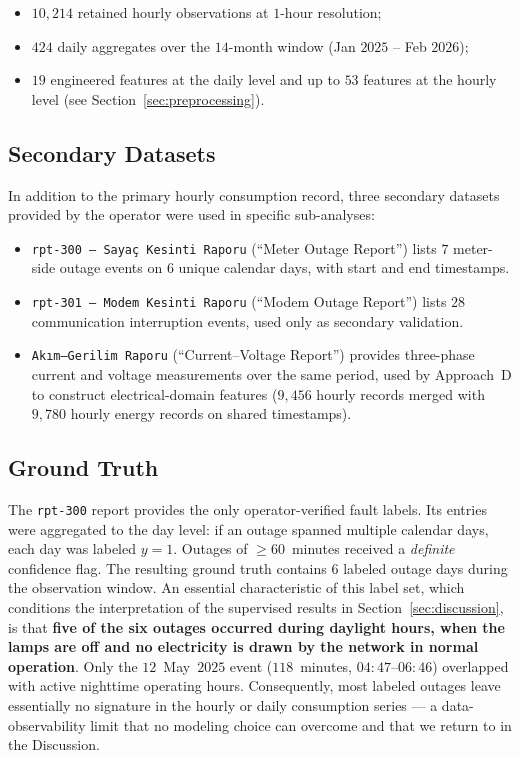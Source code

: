 \documentclass[11pt]{article}
\begin{document}
\begin{itemize}[leftmargin=1.5em,itemsep=0pt]
  \item $10{,}214$ retained hourly observations at $1$-hour resolution;
  \item $424$ daily aggregates over the $14$-month window (Jan $2025$ -- Feb $2026$);
  \item $19$ engineered features at the daily level and up to $53$ features at the hourly level (see Section~\ref{sec:preprocessing}).
\end{itemize}

\subsection{Secondary Datasets}
In addition to the primary hourly consumption record, three secondary datasets provided by the operator were used in specific sub-analyses:

\begin{itemize}[leftmargin=1.5em,itemsep=1pt]
  \item \texttt{rpt-300 --- Sayaç Kesinti Raporu} (``Meter Outage Report'') lists $7$ meter-side outage events on $6$ unique calendar days, with start and end timestamps.
  \item \texttt{rpt-301 --- Modem Kesinti Raporu} (``Modem Outage Report'') lists $28$ communication interruption events, used only as secondary validation.
  \item \texttt{Ak{\i}m--Gerilim Raporu} (``Current--Voltage Report'') provides three-phase current and voltage measurements over the same period, used by Approach~D to construct electrical-domain features ($9{,}456$ hourly records merged with $9{,}780$ hourly energy records on shared timestamps).
\end{itemize}

\subsection{Ground Truth}
\label{subsec:groundtruth}
The \texttt{rpt-300} report provides the only operator-verified fault labels. Its entries were aggregated to the day level: if an outage spanned multiple calendar days, each day was labeled $y=1$. Outages of $\geq 60$~minutes received a \emph{definite} confidence flag. The resulting ground truth contains $6$ labeled outage days during the observation window. An essential characteristic of this label set, which conditions the interpretation of the supervised results in Section~\ref{sec:discussion}, is that \textbf{five of the six outages occurred during daylight hours, when the lamps are off and no electricity is drawn by the network in normal operation}. Only the $12$~May~$2025$ event ($118$~minutes, $04{:}47$--$06{:}46$) overlapped with active nighttime operating hours. Consequently, most labeled outages leave essentially no signature in the hourly or daily consumption series --- a data-observability limit that no modeling choice can overcome and that we return to in the Discussion.
\end{document}
